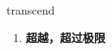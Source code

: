 
\begin{frame}
{\huge transcend}
\begin{center}
\begin{enumerate}\Large
  \item \textbf{超越，超过极限}
\end{enumerate}
\end{center}
\end{frame}
